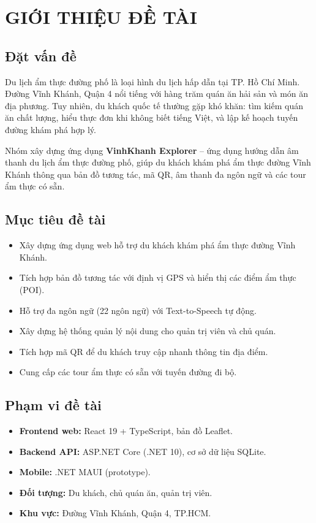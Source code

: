 \documentclass[a4paper,13pt]{report}
\begin{document}
\chapter{GIỚI THIỆU ĐỀ TÀI}

\section{Đặt vấn đề}

Du lịch ẩm thực đường phố là loại hình du lịch hấp dẫn tại TP. Hồ Chí Minh. Đường Vĩnh Khánh, Quận 4 nổi tiếng với hàng trăm quán ăn hải sản và món ăn địa phương. Tuy nhiên, du khách quốc tế thường gặp khó khăn: tìm kiếm quán ăn chất lượng, hiểu thực đơn khi không biết tiếng Việt, và lập kế hoạch tuyến đường khám phá hợp lý.

Nhóm xây dựng ứng dụng \textbf{VinhKhanh Explorer} -- ứng dụng hướng dẫn âm thanh du lịch ẩm thực đường phố, giúp du khách khám phá ẩm thực đường Vĩnh Khánh thông qua bản đồ tương tác, mã QR, âm thanh đa ngôn ngữ và các tour ẩm thực có sẵn.

\section{Mục tiêu đề tài}

\begin{itemize}[nosep]
  \item Xây dựng ứng dụng web hỗ trợ du khách khám phá ẩm thực đường Vĩnh Khánh.
  \item Tích hợp bản đồ tương tác với định vị GPS và hiển thị các điểm ẩm thực (POI).
  \item Hỗ trợ đa ngôn ngữ (22 ngôn ngữ) với Text-to-Speech tự động.
  \item Xây dựng hệ thống quản lý nội dung cho quản trị viên và chủ quán.
  \item Tích hợp mã QR để du khách truy cập nhanh thông tin địa điểm.
  \item Cung cấp các tour ẩm thực có sẵn với tuyến đường đi bộ.
\end{itemize}

\section{Phạm vi đề tài}

\begin{itemize}[nosep]
  \item \textbf{Frontend web:} React 19 + TypeScript, bản đồ Leaflet.
  \item \textbf{Backend API:} ASP.NET Core (.NET 10), cơ sở dữ liệu SQLite.
  \item \textbf{Mobile:} .NET MAUI (prototype).
  \item \textbf{Đối tượng:} Du khách, chủ quán ăn, quản trị viên.
  \item \textbf{Khu vực:} Đường Vĩnh Khánh, Quận 4, TP.HCM.
\end{itemize}
\end{document}
